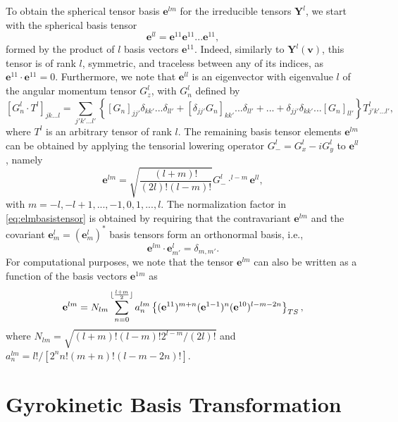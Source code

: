 To obtain the spherical tensor basis $\mathbf e^{l m}$ for the irreducible tensors $\mathbf Y^{l}$, we start with the spherical basis tensor
%
\begin{equation}
    \mathbf e^{ll}=\mathbf e^{11}\mathbf e^{11}...\mathbf e^{11},
\end{equation}
%
formed by the product of $l$ basis vectors $\mathbf e^{11}$.
%
Indeed, similarly to $\mathbf Y^l(\mathbf v)$, this tensor is of rank $l$, symmetric, and traceless between any of its indices, as $\mathbf e^{11}\cdot \mathbf e^{11} = 0$.
%
Furthermore, we note that $\mathbf e^{ll}$ is an eigenvector with eigenvalue $l$ of the angular momentum tensor $G_z^{l}$, with $G_n^{l}$ defined by
%
\begin{equation}
    \left[G_n^{l} \cdot T^l\right]_{j k ... l}=\sum_{j'k'...l'}\left\{\left[G_n\right]_{jj'}\delta_{kk'}...\delta_{ll'}+\left[ \delta_{jj'}G_n\right]_{kk'}...\delta_{ll'}+...+\delta_{jj'}\delta_{kk'}...\left[G_n\right]_{ll'}\right\} T^l_{j'k'...l'},
\end{equation}
%
where $T^l$ is an arbitrary tensor of rank $l$.
%
The remaining basis tensor elements $\mathbf e^{l m}$ can be obtained by applying the tensorial lowering operator $G^l_-=G_x^{l}-i G_y^{l}$ to $\mathbf e^{ll}$, namely
%
\begin{equation}
    \mathbf e^{l m} = \sqrt{\frac{(l+m)!}{(2l)!(l-m)!}}G^{l}_-\cdot^{l-m}\mathbf e^{ll},
\label{eq:elmbasistensor}
\end{equation}
%
with $m=-l,-l+1,...,-1,0,1,...,l$.
%
The normalization factor in \cref{eq:elmbasistensor} is obtained by requiring that the contravariant $\mathbf e^{lm}$ and the covariant $\mathbf e^l_m=(\mathbf e^l_m)^*$ basis tensors form an orthonormal basis, i.e.,
%
\begin{equation}
    \mathbf e^{l m} \cdot \mathbf e^{l}_{m'} = \delta_{m,m'}.
\end{equation}
%
For computational purposes, we note that the tensor $\mathbf e^{l m}$ can also be written as a function of the basis vectors $\mathbf e^{1m}$ as \citep{Snider2018}
%
\begin{equation}
    \mathbf e^{l m}=N_{lm}\sum_{n=0}^{\lfloor\frac{l+m}{2}\rfloor}a_n^{lm}\left\{(\mathbf e^{11})^{m+n}(\mathbf e^{1-1})^{n}(\mathbf e^{10})^{l-m-2n}\right\}_{TS},
\end{equation}
%
where $N_{lm}=\sqrt{(l+m)!(l-m)!2^{l-m}/(2l)!}$ and $a_n^{lm}=l!/[2^n n!(m+n)!(l-m-2n)!]$.

\chapter{Gyrokinetic Basis Transformation}
\label{app:tlkpj1}

